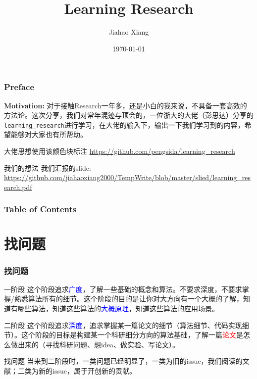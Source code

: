 \documentclass{beamer}
\title{\textbf{Learning Research}}
\author[xjh]{Jiahao Xiang\inst{1}}
\institute{
    \inst{1}
    Hengyang Normal University
}
\date{\today}
\begin{document}
\begin{frame}
    \titlepage
\end{frame}

\begin{frame}
    \frametitle{Preface}
    \textbf{Motivation:} 对于接触Research一年多，还是小白的我来说，不具备一套高效的方法论。这次分享，我们对常年混迹与顶会的，一位浙大的大佬（彭思达）分享的\texttt{learning\_research}进行学习，在大佬的输入下，输出一下我们学习到的内容，希望能够对大家也有所帮助。
    \vfill
    \begin{block}{大佬思想使用该颜色块标注}
        \url{https://github.com/pengsida/learning_research}
    \end{block}
    \begin{exampleblock}{我们的想法}
        我们汇报的slide: \url{https://github.com/jiahaoxiang2000/TempWrite/blob/master/slied/learning_research.pdf}
    \end{exampleblock}
    
    
\end{frame}

\begin{frame}
    \frametitle{Table of Contents}
    \tableofcontents
\end{frame}

\section{找问题}
\begin{frame}
    \frametitle{找问题}
    \begin{block}{一阶段}
        这个阶段追求\textcolor{blue}{广度}，了解一些基础的概念和算法。不要求深度，不要求掌握/熟悉算法所有的细节。这个阶段的目的是让你对大方向有一个大概的了解，知道有哪些算法，知道这些算法的\textcolor{blue}{大概原理}，知道这些算法的应用场景。
    \end{block}
    \begin{block}{二阶段}
        这个阶段追求\textcolor{blue}{深度}，追求掌握某一篇论文的细节（算法细节、代码实现细节）。这个阶段的目标是构建某一个科研细分方向的算法基础，了解一篇\textcolor{red}{论文}是怎么做出来的（寻找科研问题、想idea、做实验、写论文）。
    \end{block}
    \begin{exampleblock}{找问题}
        当来到二阶段时，一类问题已经明显了，一类为旧的issue，我们阅读的文献；二类为新的issue，属于开创新的贡献。
    \end{exampleblock}

\end{frame}
\end{document}
